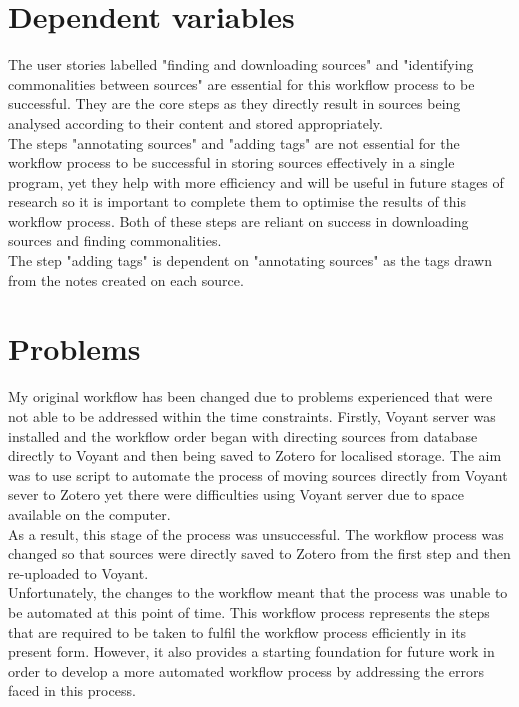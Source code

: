 \documentclass{article}
\begin{document}
\section{Dependent variables}
The user stories labelled "finding and downloading sources" and "identifying commonalities between sources" are essential for this workflow process to be successful. They are the core steps as they directly result in sources being analysed according to their content and stored appropriately.\\
The steps "annotating sources" and "adding tags" are not essential for the workflow process to be successful in storing sources effectively in a single program, yet they help with more efficiency and will be useful in future stages of research so it is important to complete them to optimise the results of this workflow process. Both of these steps are reliant on success in downloading sources and finding commonalities.\\
The step "adding tags" is dependent on "annotating sources" as the tags drawn from the notes created on each source.  

\section{Problems}
My original workflow has been changed due to problems experienced that were not able to be addressed within the time constraints. Firstly, Voyant server was installed and the workflow order began with directing sources from database directly to Voyant and then being saved to Zotero for localised storage. The aim was to use script to automate the process of moving sources directly from Voyant sever to Zotero yet there were difficulties using Voyant server due to space available on the computer.\\
As a result, this stage of the process was unsuccessful. The workflow process was changed so that sources were directly saved to Zotero from the first step and then re-uploaded to Voyant. \\
Unfortunately, the changes to the workflow meant that the process was unable to be automated at this point of time. This workflow process represents the steps that are required to be taken to fulfil the workflow process efficiently in its present form. However, it also provides a starting foundation for future work in order to develop a more automated workflow process by addressing the errors faced in this process.\\
\end{document}
